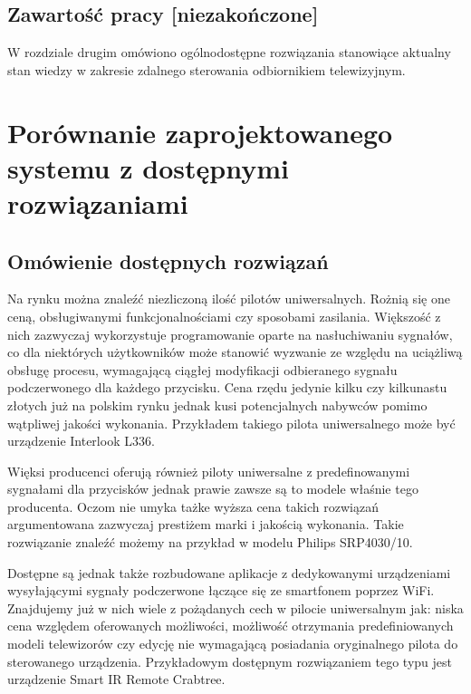 \documentclass[12pt,twoside]{article}
\begin{document}
\subsection{Zawartość pracy [niezakończone]}
W rozdziale drugim  omówiono ogólnodostępne rozwiązania stanowiące aktualny stan wiedzy w zakresie zdalnego sterowania odbiornikiem telewizyjnym.

\clearpage
\section{Porównanie zaprojektowanego systemu z do\-stęp\-ny\-mi rozwiązaniami}
\subsection{Omówienie dostępnych rozwiązań}
Na rynku można znaleźć niezliczoną ilość pilotów uniwersalnych. Rożnią się one
ceną, obsługiwanymi funkcjonalnościami czy sposobami zasilania. Większość z nich zazwyczaj
wykorzystuje programowanie oparte na nasłuchiwaniu sygnałów, co dla niektórych użytkowników może stanowić
wyzwanie ze względu na uciążliwą obsługę procesu, wymagającą ciągłej modyfikacji odbieranego
sygnału podczerwonego dla każdego przycisku. Cena rzędu jedynie kilku czy kilkunastu złotych
już na polskim rynku jednak kusi potencjalnych nabywców pomimo wątpliwej jakości wykonania. Przykładem
takiego pilota uniwersalnego może być urządzenie Interlook L336\cite{cheapController}.

Więksi producenci oferują również piloty uniwersalne z predefinowanymi sygnałami dla przycisków jednak
prawie zawsze są to modele właśnie tego producenta. Oczom nie umyka tażke wyższa cena takich
rozwiązań argumentowana zazwyczaj prestiżem marki i jakością wykonania. Takie rozwiązanie znaleźć
możemy na przykład w modelu Philips SRP4030/10\cite{expensiveController}.

Dostępne są jednak także rozbudowane aplikacje z dedykowanymi urządzeniami wysyłającymi sygnały podczerwone łączące się ze smartfonem poprzez WiFi. Znajdujemy już w nich wiele z pożądanych cech w pilocie uniwersalnym jak: niska cena względem oferowanych możliwości, możliwość otrzymania predefiniowanych modeli telewizorów czy edycję nie wymagającą posiadania oryginalnego pilota do sterowanego urządzenia. Przykładowym dostępnym rozwiązaniem tego typu jest urządzenie Smart IR Remote Crabtree\cite{appController}.
\end{document}
